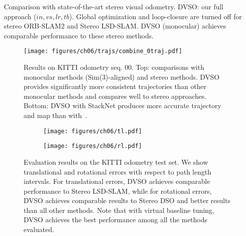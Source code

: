\documentclass[runningheads]{llncs}
\begin{document}
\begin{table}[tb]
	\caption{Comparison with state-of-the-art stereo visual odometry. 
		DVSO: our full approach ($in,vs,lr,tb$). Global optimization and loop-closure are turned off for 
		stereo ORB-SLAM2 and Stereo LSD-SLAM. DVSO (monocular) achieves comparable 
		performance to 
		these 
		stereo methods.}
	\label{tab:compare_other_stereo}
\end{table}\begin{SCfigure}
	\centering
		\texttt{[image: figures/ch06/trajs/combine\_0traj.pdf]}
	\caption{Results on KITTI odometry seq. 00. Top: 
		comparisons with monocular methods (Sim(3)-aligned) and stereo methods. 
		DVSO provides significantly more consistent 
		trajectories than other monocular methods and compares well to 
		stereo approaches. Bottom: DVSO with StackNet produces more accurate 
		trajectory and map than with~\cite{godard2016unsupervised}. }
	\label{fig:kitti_traj}
\end{SCfigure}\begin{figure}[tb]
	\centering
	\begin{subfigure}[t]{.49\textwidth}
		\centering
		\texttt{[image: figures/ch06/tl.pdf]}
	\end{subfigure}
	\begin{subfigure}[t]{.49\textwidth}
		\centering
		\texttt{[image: figures/ch06/rl.pdf]}
	\end{subfigure}
	\caption{Evaluation results on the KITTI odometry test set. 
		We show translational and rotational errors with respect to 
		path length intervals. For translational errors, DVSO achieves 
		comparable performance to Stereo LSD-SLAM, while for rotational errors, DVSO 
		achieves comparable results to Stereo DSO 
		and better results than all other methods. Note that with virtual baseline 
		tuning, DVSO achieves the best performance among all the 
		methods evaluated.}
	\label{fig:kitti_test_set}
\end{figure}
\end{document}
